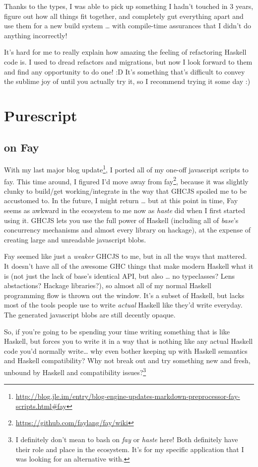 \documentclass[]{article}
\renewcommand{\href}[2]{#2\footnote{\url{#1}}}
\begin{document}
Thanks to the types, I was able to pick up something I hadn't touched in
3 years, figure out how all things fit together, and completely gut
everything apart and use them for a new build system \ldots{} with
compile-time assurances that I didn't do anything incorrectly!

It's hard for me to really explain how amazing the feeling of
refactoring Haskell code is. I used to dread refactors and migrations,
but now I look forward to them and find any opportunity to do one! :D
It's something that's difficult to convey the sublime joy of until you
actually try it, so I recommend trying it some day :)

\section{Purescript}\label{purescript}

\subsection{on Fay}\label{on-fay}

With my
\href{http://blog.jle.im/entry/blog-engine-updates-markdown-preprocessor-fay-scripts.html\#fay}{last
major blog update}, I ported all of my one-off javascript scripts to
fay. This time around, I figured I'd move away from
\href{https://github.com/faylang/fay/wiki}{fay}, because it was slightly
clunky to build/get working/integrate in the way that GHCJS spoiled me
to be accustomed to. In the future, I might return \ldots{} but at this
point in time, Fay seems as awkward in the ecosystem to me now as
\emph{haste} did when I first started using it. GHCJS lets you use the
full power of Haskell (including all of \emph{base}'s concurrency
mechanisms and almost every library on hackage), at the expense of
creating large and unreadable javascript blobs.

Fay seemed like just a \emph{weaker} GHCJS to me, but in all the ways
that mattered. It doesn't have all of the awesome GHC things that make
modern Haskell what it is (not just the lack of base's identical API,
but also \ldots{} no typeclasses? Lens abstactions? Hackage libraries?),
so almost all of my normal Haskell programming flow is thrown out the
window. It's a subset of Haskell, but lacks most of the tools people use
to write \emph{actual} Haskell like they'd write everyday. The generated
javascript blobs are still decently opaque.

So, if you're going to be spending your time writing something that is
like Haskell, but forces you to write it in a way that is nothing like
any actual Haskell code you'd normally write\ldots{} why even bother
keeping up with Haskell semantics and Haskell compatibility? Why not
break out and try something new and fresh, unbound by Haskell and
compatibility issues?\footnote{I definitely don't mean to bash on
  \emph{fay} or \emph{haste} here! Both definitely have their role and
  place in the ecosystem. It's for my specific application that I was
  looking for an alternative with.}
\end{document}
